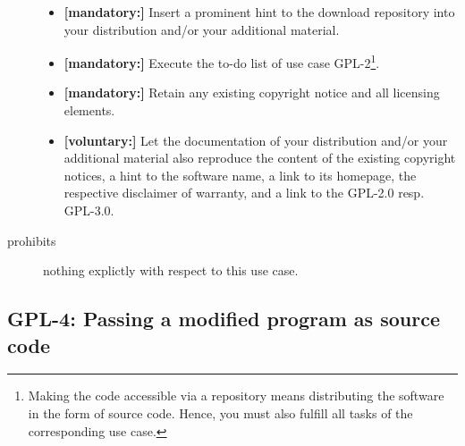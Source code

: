 \begin{description}
\begin{itemize}
  \item \textbf{[mandatory:]} Insert a prominent hint to the download repository
  into your distribution and/or your additional material.
  
  \item \textbf{[mandatory:]} Execute the to-do list of use case GPL-2\footnote{
  Making the code accessible via a repository means distributing the software in
  the form of source code. Hence, you must also fulfill all tasks of the
  corresponding use case.}.

  \item \textbf{[mandatory:]} Retain any existing copyright notice and all
  licensing elements. 
     
  \item \textbf{[voluntary:]} Let the documentation of your distribution and/or
  your additional material also reproduce the content of the existing
  copyright notices, a hint to the software name, a link to its homepage,
  the respective disclaimer of warranty, and a link to the GPL-2.0 resp.
  GPL-3.0.

\end{itemize}

\item[prohibits] nothing explictly with respect to this use case.

\end{description}

\subsection{GPL-4: Passing a modified program as source code}
\label{OSUC-04-GPL} 

